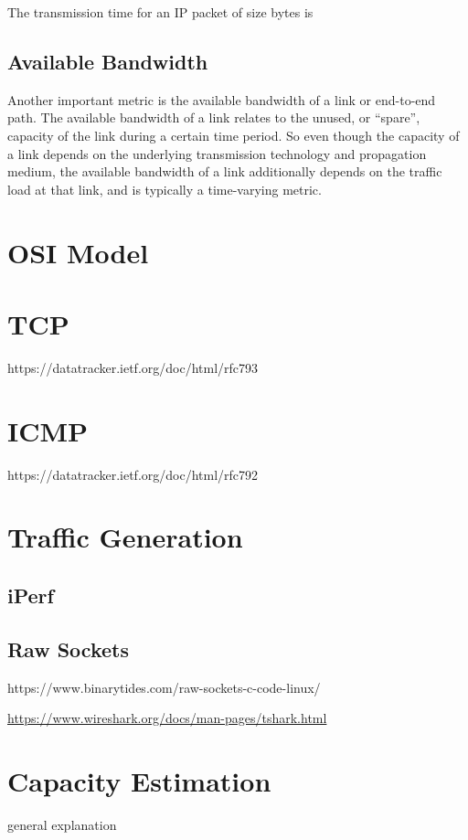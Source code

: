 
The transmission time for an IP packet of size bytes is

\subsection*{Available Bandwidth}
Another important metric is the available bandwidth of a link or end-to-end path. The available bandwidth of a link relates to the unused, or “spare”, capacity of the link during a certain time period. So even though the capacity of a link depends on the underlying transmission technology and propagation medium, the available bandwidth of a link additionally depends on the traffic load at that link, and is typically a time-varying metric.

\section{OSI Model}

\section{TCP}
https://datatracker.ietf.org/doc/html/rfc793

\section{ICMP}
https://datatracker.ietf.org/doc/html/rfc792

\section{Traffic Generation}

\subsection*{iPerf}

\subsection*{Raw Sockets}
https://www.binarytides.com/raw-sockets-c-code-linux/

\url{https://www.wireshark.org/docs/man-pages/tshark.html}

\section{Capacity Estimation}
general explanation